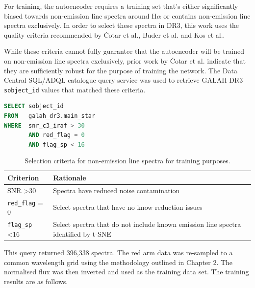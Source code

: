 For training, the autoencoder requires a training set that's either significantly biased towards non-emission line spectra around H$\alpha$ or contains non-emission line spectra exclusively. In order to select these spectra in DR3, this work uses the quality criteria recommended by Čotar et al.\cite{vcotar2021galah}, Buder et al.\cite{buder2021galah+} and Kos et al.\cite{kos2017galah}. 

While these criteria cannot fully guarantee that the autoencoder will be trained on non-emission line spectra exclusively, prior work by Čotar et al. indicate that they are sufficiently robust for the purpose of training the network. The Data Central SQL/ADQL catalogue query service was used to retrieve GALAH DR3 \texttt{sobject\_id} values that matched these criteria.

\begin{lstlisting}[language=SQL]
SELECT sobject_id
FROM   galah_dr3.main_star
WHERE  snr_c3_iraf > 30
       AND red_flag = 0
       AND flag_sp < 16 
\end{lstlisting}

\begin{table}[!htb]
\begin{center}
\begin{tabular}{|l|l|}
\hline
\textbf{Criterion}    & \textbf{Rationale}                                                                 \\ \hline
SNR \textgreater 30   & Spectra have reduced noise contamination      \\ \hline
\texttt{red\_flag} = 0         & Select spectra that have no know reduction issues                                  \\ \hline
\texttt{flag\_sp} \textless 16 & Select spectra that do not include known emission line spectra identified by t-SNE \\ \hline
\end{tabular}
\caption{Selection criteria for non-emission line spectra for training purposes.}
\label{table:Selection Criteria}
\end{center}
\end{table}

This query returned 396,338 spectra. The red arm data was re-sampled to a common wavelength grid using the methodology outlined in Chapter 2. The normalised flux was then inverted and used as the training data set. The training results are as follows.

